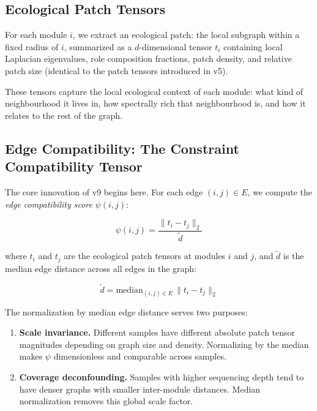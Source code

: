 \documentclass{../yalumba}
\begin{document}
\subsection{Ecological Patch Tensors}

For each module $i$, we extract an ecological patch: the local subgraph
within a fixed radius of $i$, summarized as a $d$-dimensional tensor
$t_i$ containing local Laplacian eigenvalues, role composition fractions,
patch density, and relative patch size (identical to the patch tensors
introduced in v5).


These tensors capture the local ecological context of each module: what
kind of neighbourhood it lives in, how spectrally rich that neighbourhood
is, and how it relates to the rest of the graph.

\subsection{Edge Compatibility: The Constraint Compatibility Tensor}

The core innovation of v9 begins here.  For each edge $(i,j) \in E$, we
compute the \emph{edge compatibility score} $\psi(i,j)$:

\begin{equation}
  \psi(i,j) = \frac{\|t_i - t_j\|_2}{\tilde{d}}
  \label{eq:compatibility}
\end{equation}

where $t_i$ and $t_j$ are the ecological patch tensors at modules $i$ and
$j$, and $\tilde{d}$ is the median edge distance across all edges in the
graph:

\begin{equation}
  \tilde{d} = \text{median}_{(i,j) \in E}\, \|t_i - t_j\|_2
  \label{eq:median-distance}
\end{equation}

The normalization by median edge distance serves two purposes:

\begin{enumerate}
  \item \textbf{Scale invariance.}  Different samples have different absolute
    patch tensor magnitudes depending on graph size and density.  Normalizing
    by the median makes $\psi$ dimensionless and comparable across samples.
  \item \textbf{Coverage deconfounding.}  Samples with higher sequencing
    depth tend to have denser graphs with smaller inter-module distances.
    Median normalization removes this global scale factor.
\end{enumerate}
\end{document}
